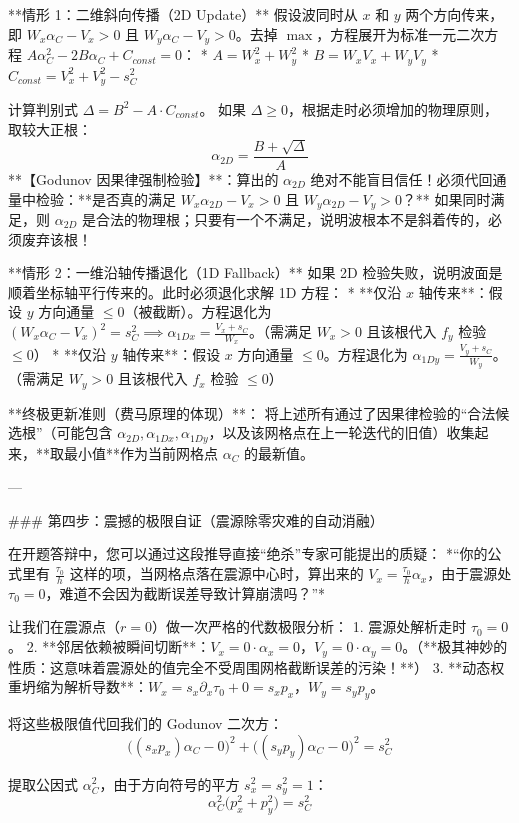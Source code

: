 \documentclass[12pt]{article}
\begin{document}
{**情形 1：二维斜向传播（2D Update）**
假设波同时从 $x$ 和 $y$ 两个方向传来，即 $W_x \alpha_C - V_x > 0$ 且 $W_y \alpha_C - V_y > 0$。去掉 $\max$，方程展开为标准一元二次方程 $A\alpha_C^2 - 2B\alpha_C + C_{const} = 0$：
* $A = W_x^2 + W_y^2$
* $B = W_x V_x + W_y V_y$
* $C_{const} = V_x^2 + V_y^2 - s_C^2$

计算判别式 $\Delta = B^2 - A \cdot C_{const}$。
如果 $\Delta \ge 0$，根据走时必须增加的物理原则，取较大正根：
$$ \alpha_{2D} = \frac{B + \sqrt{\Delta}}{A} $$
**【Godunov 因果律强制检验】**：算出的 $\alpha_{2D}$ 绝对不能盲目信任！必须代回通量中检验：**是否真的满足 $W_x \alpha_{2D} - V_x > 0$ 且 $W_y \alpha_{2D} - V_y > 0$？**
如果同时满足，则 $\alpha_{2D}$ 是合法的物理根；只要有一个不满足，说明波根本不是斜着传的，必须废弃该根！

**情形 2：一维沿轴传播退化（1D Fallback）**
如果 2D 检验失败，说明波面是顺着坐标轴平行传来的。此时必须退化求解 1D 方程：
* **仅沿 $x$ 轴传来**：假设 $y$ 方向通量 $\le 0$（被截断）。方程退化为 $(W_x \alpha_C - V_x)^2 = s_C^2 \implies \alpha_{1Dx} = \frac{V_x + s_C}{W_x}$。（需满足 $W_x > 0$ 且该根代入 $f_y$ 检验 $\le 0$）
* **仅沿 $y$ 轴传来**：假设 $x$ 方向通量 $\le 0$。方程退化为 $\alpha_{1Dy} = \frac{V_y + s_C}{W_y}$。（需满足 $W_y > 0$ 且该根代入 $f_x$ 检验 $\le 0$）

**终极更新准则（费马原理的体现）**：
将上述所有通过了因果律检验的“合法候选根”（可能包含 $\alpha_{2D}, \alpha_{1Dx}, \alpha_{1Dy}$，以及该网格点在上一轮迭代的旧值）收集起来，**取最小值**作为当前网格点 $\alpha_C$ 的最新值。

---

### 第四步：震撼的极限自证（震源除零灾难的自动消融）

在开题答辩中，您可以通过这段推导直接“绝杀”专家可能提出的质疑：
*“你的公式里有 $\frac{\tau_0}{h}$ 这样的项，当网格点落在震源中心时，算出来的 $V_x = \frac{\tau_0}{h} \alpha_x$，由于震源处 $\tau_0=0$，难道不会因为截断误差导致计算崩溃吗？”*

让我们在震源点（$r=0$）做一次严格的代数极限分析：
1. 震源处解析走时 $\tau_0 = 0$。
2. **邻居依赖被瞬间切断**：$V_x = 0 \cdot \alpha_x = 0$，$V_y = 0 \cdot \alpha_y = 0$。（**极其神妙的性质：这意味着震源处的值完全不受周围网格截断误差的污染！**）
3. **动态权重坍缩为解析导数**：$W_x = s_x \partial_x \tau_0 + 0 = s_x p_x$，$W_y = s_y p_y$。

将这些极限值代回我们的 Godunov 二次方：
$$ \big( (s_x p_x) \alpha_C - 0 \big)^2 + \big( (s_y p_y) \alpha_C - 0 \big)^2 = s_C^2 $$

提取公因式 $\alpha_C^2$，由于方向符号的平方 $s_x^2 = s_y^2 = 1$：
$$ \alpha_C^2 \Big( p_x^2 + p_y^2 \Big) = s_C^2 $$

}
\end{document}
